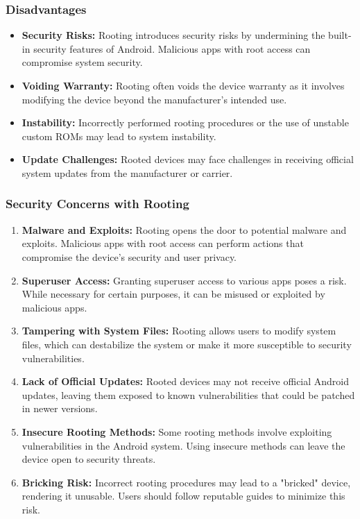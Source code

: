 \documentclass[11pt]{article}
\begin{document}
\subsubsection*{Disadvantages}
\begin{itemize}
      \item \textbf{Security Risks:} Rooting introduces security risks by undermining the built-in security features of Android. Malicious apps with root access can compromise system security.
      \item \textbf{Voiding Warranty:} Rooting often voids the device warranty as it involves modifying the device beyond the manufacturer's intended use.
      \item \textbf{Instability:} Incorrectly performed rooting procedures or the use of unstable custom ROMs may lead to system instability.
      \item \textbf{Update Challenges:} Rooted devices may face challenges in receiving official system updates from the manufacturer or carrier.
\end{itemize}

\subsubsection{Security Concerns with Rooting}
\begin{enumerate}
      \item \textbf{Malware and Exploits:} Rooting opens the door to potential malware and exploits. Malicious apps with root access can perform actions that compromise the device's security and user privacy.
      \item \textbf{Superuser Access:} Granting superuser access to various apps poses a risk. While necessary for certain purposes, it can be misused or exploited by malicious apps.
      \item \textbf{Tampering with System Files:} Rooting allows users to modify system files, which can destabilize the system or make it more susceptible to security vulnerabilities.
      \item \textbf{Lack of Official Updates:} Rooted devices may not receive official Android updates, leaving them exposed to known vulnerabilities that could be patched in newer versions.
      \item \textbf{Insecure Rooting Methods:} Some rooting methods involve exploiting vulnerabilities in the Android system. Using insecure methods can leave the device open to security threats.
      \item \textbf{Bricking Risk:} Incorrect rooting procedures may lead to a "bricked" device, rendering it unusable. Users should follow reputable guides to minimize this risk.
\end{enumerate}
\end{document}
